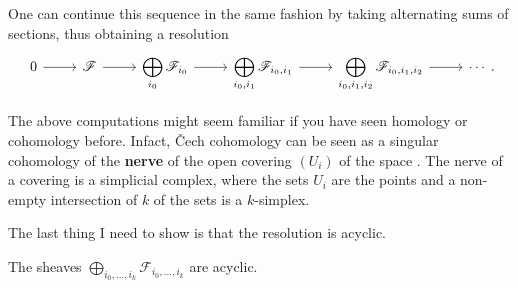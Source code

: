 One can continue this sequence in the same fashion by taking alternating
sums of sections, thus obtaining a resolution
\[\begin{tikzcd}
    0\rar & \mathscr{F}\rar
    & \displaystyle\bigoplus_{i_{0}}\mathscr{F}_{i_{0}}\rar
    & \displaystyle\bigoplus_{i_{0},i_{1}}\mathscr{F}_{i_{0},i_{1}}\rar
    & \displaystyle\bigoplus_{i_{0},i_{1},i_{2}}\mathscr{F}_{i_{0},i_{1},i_{2}}
    \rar & \cdots
  \end{tikzcd}.\]
\begin{rem}
  The above computations might seem familiar if you have seen homology
  or cohomology before. Infact, \v Cech cohomology can be seen as a singular
  cohomology of the \textbf{nerve} of the open covering $(U_{i})$ of the space
  \cite{hatcher}. The nerve of a covering is a simplicial complex, where the
  sets $U_{i}$ are the points and a non-empty intersection of $k$ of the sets
  is a $k$-simplex.
\end{rem}
The last thing I need to show is that the resolution is acyclic.
\begin{lemm}
  The sheaves
  $\displaystyle\bigoplus_{i_{0},\ldots,i_{k}}\mathscr{F}_{i_{0},\ldots,i_{k}}$
  are acyclic.
\end{lemm}

